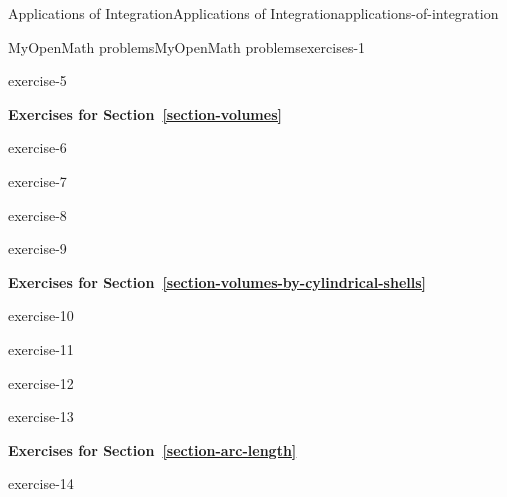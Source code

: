 \documentclass[oneside,10pt,]{book}
\numberwithin{equation}{section}
\begin{document}
\begin{chapterptx}{Applications of Integration}{}{Applications of Integration}{}{}{applications-of-integration}
\begin{exercises-section}{MyOpenMath problems}{}{MyOpenMath problems}{}{}{exercises-1}
\begin{exercisegroup}
\begin{divisionexerciseeg}{5}{}{}{exercise-5}%
\end{divisionexerciseeg}%
\end{exercisegroup}
\par\medskip\noindent
\par\medskip\noindent%
\textbf{Exercises for Section~\ref*{section-volumes}}\space\space\hypertarget{exercisegroup-2}{}%
\begin{exercisegroup}
\begin{divisionexerciseeg}{6}{}{}{exercise-6}%
\end{divisionexerciseeg}%
\begin{divisionexerciseeg}{7}{}{}{exercise-7}%
\end{divisionexerciseeg}%
\begin{divisionexerciseeg}{8}{}{}{exercise-8}%
\end{divisionexerciseeg}%
\begin{divisionexerciseeg}{9}{}{}{exercise-9}%
\end{divisionexerciseeg}%
\end{exercisegroup}
\par\medskip\noindent
\par\medskip\noindent%
\textbf{Exercises for Section~\ref*{section-volumes-by-cylindrical-shells}}\space\space\hypertarget{exercisegroup-3}{}%
\begin{exercisegroup}
\begin{divisionexerciseeg}{10}{}{}{exercise-10}%
\end{divisionexerciseeg}%
\begin{divisionexerciseeg}{11}{}{}{exercise-11}%
\end{divisionexerciseeg}%
\begin{divisionexerciseeg}{12}{}{}{exercise-12}%
\end{divisionexerciseeg}%
\begin{divisionexerciseeg}{13}{}{}{exercise-13}%
\end{divisionexerciseeg}%
\end{exercisegroup}
\par\medskip\noindent
\par\medskip\noindent%
\textbf{Exercises for Section~\ref*{section-arc-length}}\space\space\hypertarget{exercisegroup-4}{}%
\begin{exercisegroup}
\begin{divisionexerciseeg}{14}{}{}{exercise-14}%
\end{divisionexerciseeg}%

\end{exercisegroup}
\end{exercises-section}
\end{chapterptx}
\end{document}
